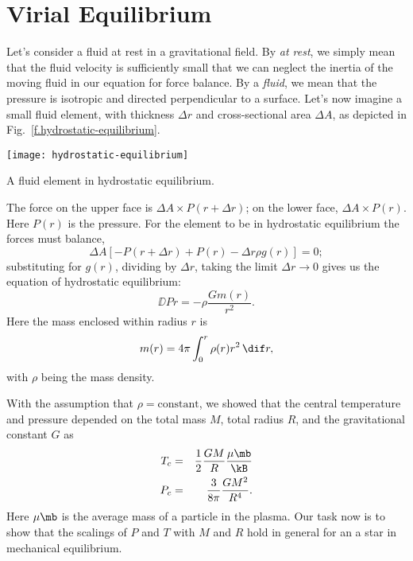 
\section{Virial Equilibrium}
\label{s.virial-equilibrium}

Let's consider a fluid at rest in a gravitational field. By \emph{at rest}, we simply mean that the fluid velocity is sufficiently small that we can neglect the inertia of the moving fluid in our equation for force balance.  By a \emph{fluid}, we mean that the pressure is isotropic and directed perpendicular to a surface.  Let's now imagine a small fluid element, with thickness $\Delta r$ and cross-sectional area $\Delta A$, as depicted in Fig.~\ref{f.hydrostatic-equilibrium}.
\begin{marginfigure}
\texttt{[image: hydrostatic-equilibrium]}
\caption[A fluid element in hydrostatic equilibrium]{A fluid element in hydrostatic equilibrium.
\label{f.hydrostatic-equilibrium}}
\end{marginfigure}

The force on the upper face is $\Delta A\times P(r+\Delta r)$; on the lower face, $\Delta A\times P(r)$.  Here $P(r)$ is the pressure.  For the element to be in hydrostatic equilibrium the forces must balance,
\[
        \Delta A \left[ -P(r+\Delta r) + P(r) - \Delta r \rho g(r)  \right] = 0;
\]
substituting for $g(r)$, dividing by $\Delta r$, taking the limit $\Delta r \to 0$ gives us the equation of hydrostatic equilibrium:
\begin{equation}\label{e.hydrostatic-equilibrium}
        \DD{P}{r} = -\rho \frac{Gm(r)}{r^{2}}.
\end{equation}
Here the mass enclosed within radius $r$ is
\begin{equation}\label{e.mass-continuity}
	m(r) = 4\pi \int_{0}^{r}\rho(r)r^{2}\,\dif r,
\end{equation}
with $\rho$ being the mass density.

With the assumption that $\rho = \textrm{constant}$, we showed that the central temperature and pressure depended on the total mass $M$, total radius $R$, and the gravitational constant $G$ as
\begin{eqnarray}
\label{e.Tc}
T_{c} &=& \frac{1}{2}\frac{GM}{R}\frac{\mu\mb}{\kB}\\
\label{e.Pc}
P_{c} &=& \frac{3}{8\pi}\frac{GM^{2}}{R^{4}}.
\end{eqnarray}
Here $\mu\mb$ is the average mass of a particle in the plasma. Our task now is to show that the scalings of $P$ and $T$ with $M$ and $R$ hold in general for an a star in mechanical equilibrium.


